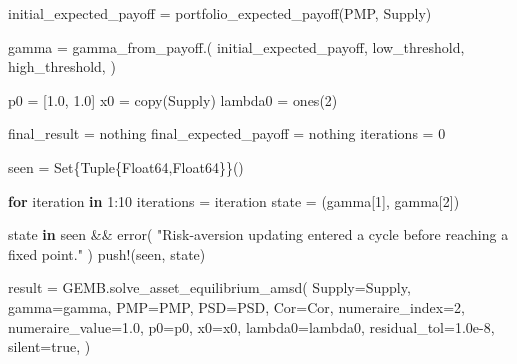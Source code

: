 \documentclass[
  letterpaper,
  DIV=11,
  numbers=noendperiod]{scrreprt}
\newenvironment{Shaded}{\begin{snugshade}}{\end{snugshade}}
\newcommand{\ConstantTok}[1]{\textcolor[rgb]{0.56,0.35,0.01}{#1}}
\newcommand{\ControlFlowTok}[1]{\textcolor[rgb]{0.00,0.23,0.31}{\textbf{#1}}}
\newcommand{\DataTypeTok}[1]{\textcolor[rgb]{0.68,0.00,0.00}{#1}}
\newcommand{\FloatTok}[1]{\textcolor[rgb]{0.68,0.00,0.00}{#1}}
\newcommand{\FunctionTok}[1]{\textcolor[rgb]{0.28,0.35,0.67}{#1}}
\newcommand{\KeywordTok}[1]{\textcolor[rgb]{0.00,0.23,0.31}{\textbf{#1}}}
\newcommand{\NormalTok}[1]{\textcolor[rgb]{0.00,0.23,0.31}{#1}}
\newcommand{\OperatorTok}[1]{\textcolor[rgb]{0.37,0.37,0.37}{#1}}
\newcommand{\StringTok}[1]{\textcolor[rgb]{0.13,0.47,0.30}{#1}}
\begin{document}
\begin{codelisting}
{\begin{Shaded}
\begin{Highlighting}[]
\NormalTok{    initial\_expected\_payoff }\OperatorTok{=}
        \FunctionTok{portfolio\_expected\_payoff}\NormalTok{(PMP, Supply)}

\NormalTok{    gamma }\OperatorTok{=}
        \FunctionTok{gamma\_from\_payoff}\NormalTok{.(}
\NormalTok{            initial\_expected\_payoff,}
\NormalTok{            low\_threshold,}
\NormalTok{            high\_threshold,}
\NormalTok{        )}

\NormalTok{    p0 }\OperatorTok{=}\NormalTok{ [}\FloatTok{1.0}\NormalTok{, }\FloatTok{1.0}\NormalTok{]}
\NormalTok{    x0 }\OperatorTok{=} \FunctionTok{copy}\NormalTok{(Supply)}
\NormalTok{    lambda0 }\OperatorTok{=} \FunctionTok{ones}\NormalTok{(}\FloatTok{2}\NormalTok{)}

\NormalTok{    final\_result }\OperatorTok{=} \ConstantTok{nothing}
\NormalTok{    final\_expected\_payoff }\OperatorTok{=} \ConstantTok{nothing}
\NormalTok{    iterations }\OperatorTok{=} \FloatTok{0}

\NormalTok{    seen }\OperatorTok{=} \FunctionTok{Set}\DataTypeTok{\{Tuple\{Float64,Float64\}\}}\NormalTok{()}

    \ControlFlowTok{for}\NormalTok{ iteration }\KeywordTok{in} \FloatTok{1}\OperatorTok{:}\FloatTok{10}
\NormalTok{        iterations }\OperatorTok{=}\NormalTok{ iteration}
\NormalTok{        state }\OperatorTok{=}\NormalTok{ (gamma[}\FloatTok{1}\NormalTok{], gamma[}\FloatTok{2}\NormalTok{])}

\NormalTok{        state }\KeywordTok{in}\NormalTok{ seen }\OperatorTok{\&\&} \FunctionTok{error}\NormalTok{(}
            \StringTok{"Risk{-}aversion updating entered a cycle before reaching a fixed point."}
\NormalTok{        )}
        \FunctionTok{push!}\NormalTok{(seen, state)}

\NormalTok{        result }\OperatorTok{=}\NormalTok{ GEMB.}\FunctionTok{solve\_asset\_equilibrium\_amsd}\NormalTok{(}
\NormalTok{            Supply}\OperatorTok{=}\NormalTok{Supply,}
\NormalTok{            gamma}\OperatorTok{=}\NormalTok{gamma,}
\NormalTok{            PMP}\OperatorTok{=}\NormalTok{PMP,}
\NormalTok{            PSD}\OperatorTok{=}\NormalTok{PSD,}
\NormalTok{            Cor}\OperatorTok{=}\NormalTok{Cor,}
\NormalTok{            numeraire\_index}\OperatorTok{=}\FloatTok{2}\NormalTok{,}
\NormalTok{            numeraire\_value}\OperatorTok{=}\FloatTok{1.0}\NormalTok{,}
\NormalTok{            p0}\OperatorTok{=}\NormalTok{p0,}
\NormalTok{            x0}\OperatorTok{=}\NormalTok{x0,}
\NormalTok{            lambda0}\OperatorTok{=}\NormalTok{lambda0,}
\NormalTok{            residual\_tol}\OperatorTok{=}\FloatTok{1.0e{-}8}\NormalTok{,}
\NormalTok{            silent}\OperatorTok{=}\ConstantTok{true}\NormalTok{,}
\NormalTok{        )}


\end{Highlighting}
\end{Shaded}}
\end{codelisting}
\end{document}
